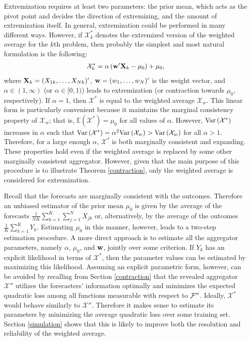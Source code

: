 \documentclass[11pt]{article}
\newcommand{\E}{\mathbb{E}}
\theoremstyle{definition}
\theoremstyle{definition}
\def\w{{\bf w}}
\def\X{{\bf X}}
\def\F{{\cal F}}
\def\E{{\mathbb E}}
\def\Var{{\rm Var}\,}
\begin{document}
Extremization requires at least two parameters: the prior mean, which acts as the pivot point and decides the direction of extremizing, and the amount of extremization itself.  In general, extremization could be performed in many different ways. However, if $\mathcal{X}_k^*$ denotes the extremized version of the weighted average for the $k$th problem, then probably the simplest and most natural formulation is the following:
\begin{align*}
\mathcal{X}_k^* = \alpha  \left(  \w'\X_{k} - \mu_0\right) + \mu_0,
\end{align*}
 where $\X_k = (X_{1k}, \dots, X_{Nk})'$, $\w = (w_1, \dots, w_N)'$ is the weight vector, and $\alpha \in (1, \infty)$ (or $\alpha \in [0, 1)$) leads to extremization (or contraction towards $\mu_0$, respectively). If $\alpha = 1$, then $\mathcal{X}^*$ is equal to the weighted average $\mathcal{X}_w$.  This linear form is particularly convenient because it maintains the marginal consistency property of $\mathcal{X}_w$; that is, $\E(\mathcal{X}^*) = \mu_0$ for all values of $\alpha$.  However, $\Var(\mathcal{X}^*)$ increases in $\alpha$ such that $\Var(\mathcal{X}^*) = \alpha^2 \Var(\mathcal{X}_w) > \Var(\mathcal{X}_w)$ for all $\alpha > 1$. Therefore, for a large enough $\alpha$, $\mathcal{X}^*$ is both marginally consistent and expanding. These properties hold even if the weighted average is replaced by some other marginally consistent aggregator. However, given that the main purpose of this procedure is to illustrate Theorem \ref{contraction}, only the weighted average is considered for extremization.

Recall that the forecasts are marginally consistent with the outcomes. Therefore an unbiased estimator of the prior mean $\mu_0$ is given by the average of the forecasts $\frac{1}{NK} \sum_{k=1}^K\sum_{j=1}^N X_{jk}$ or, alternatively, by the average of the outcomes $\frac{1}{K} \sum_{k=1}^K Y_k$. Estimating $\mu_0$ in this manner, however, leads to a two-step estimation procedure. A more direct approach is to estimate all the aggregator parameters, namely $\alpha$, $\mu_0$, and $\w$, jointly over some criterion. If $Y_k$ has an explicit likelihood in terms of $\mathcal{X}^*$, then the parameter values can be estimated by maximizing this likelihood. Assuming an explicit parametric form, however, can be avoided by recalling from Section \ref{contraction} that the revealed aggregator $\mathcal{X}''$ utilizes the forecasters' information optimally and minimizes the expected quadratic loss among all functions measurable with respect to $\F''$. Ideally, $\mathcal{X}^*$ would behave similarly to $\mathcal{X}''$. Therefore it makes sense to estimate its parameters by minimizing the average quadratic loss over some training set. Section \ref{simulation} shows that this is likely to improve both the resolution and reliability of the weighted average. 
\end{document}
